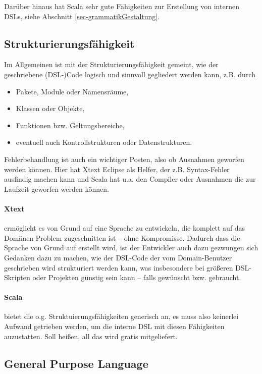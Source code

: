 Darüber hinaus hat Scala sehr gute Fähigkeiten zur Erstellung von internen
DSLs, siehe Abschnitt \ref{sec-grammatikGestaltung}.


\subsection{Strukturierungsfähigkeit}\label{sec-strukturierungsfaehigkeit}

Im Allgemeinen ist mit der Strukturierungsfähigkeit gemeint, wie der
geschriebene (DSL-)Code logisch und sinnvoll gegliedert werden kann,
z.B. durch

\begin{itemize}
  \item Pakete, Module oder Namensräume,
  \item Klassen oder Objekte,
  \item Funktionen bzw. Geltungsbereiche,
  \item eventuell auch Kontrollstrukturen oder Datenstrukturen.
\end{itemize}

Fehlerbehandlung ist auch ein wichtiger Posten, also ob Ausnahmen
geworfen werden können. Hier hat Xtext Eclipse als Helfer, der
z.B. Syntax-Fehler ausfindig machen kann und Scala hat u.a. den Compiler
oder Ausnahmen die zur Laufzeit geworfen werden können.

\paragraph{Xtext} ermöglicht es von Grund auf eine Sprache zu entwickeln,
die komplett auf das Domänen-Problem zugeschnitten ist -- ohne Kompromisse.
Dadurch dass die Sprache von Grund auf erstellt wird, ist der Entwickler
auch dazu gezwungen sich Gedanken dazu zu machen, wie der DSL-Code
der vom Domain-Benutzer geschrieben wird strukturiert werden kann,
was insbesondere bei größeren DSL-Skripten oder
Projekten günstig sein kann -- falls gewünscht bzw. gebraucht.

\paragraph{Scala} bietet die o.g. Struktuierungsfähigkeiten generisch an,
es muss also keinerlei Aufwand getrieben werden, um die interne DSL mit
diesen Fähigkeiten auzustatten. Soll heißen, all das wird gratis mitgeliefert.


\subsection{General Purpose Language}\label{sec-gpl}

